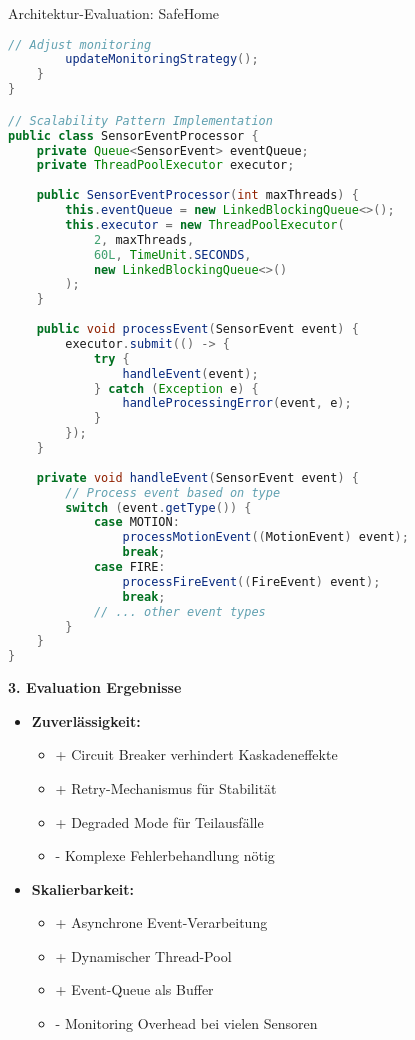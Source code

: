 \begin{example2}[breakable]{Architektur-Evaluation: SafeHome}
\begin{lstlisting}[language=Java, style=basesmol]
        // Adjust monitoring
        updateMonitoringStrategy();
    }
}

// Scalability Pattern Implementation
public class SensorEventProcessor {
    private Queue<SensorEvent> eventQueue;
    private ThreadPoolExecutor executor;
    
    public SensorEventProcessor(int maxThreads) {
        this.eventQueue = new LinkedBlockingQueue<>();
        this.executor = new ThreadPoolExecutor(
            2, maxThreads,
            60L, TimeUnit.SECONDS,
            new LinkedBlockingQueue<>()
        );
    }
    
    public void processEvent(SensorEvent event) {
        executor.submit(() -> {
            try {
                handleEvent(event);
            } catch (Exception e) {
                handleProcessingError(event, e);
            }
        });
    }
    
    private void handleEvent(SensorEvent event) {
        // Process event based on type
        switch (event.getType()) {
            case MOTION:
                processMotionEvent((MotionEvent) event);
                break;
            case FIRE:
                processFireEvent((FireEvent) event);
                break;
            // ... other event types
        }
    }
}

\end{lstlisting}

\textbf{3. Evaluation Ergebnisse}
\begin{itemize}
    \item \textbf{Zuverlässigkeit:}
    \begin{itemize}
        \item + Circuit Breaker verhindert Kaskadeneffekte
        \item + Retry-Mechanismus für Stabilität
        \item + Degraded Mode für Teilausfälle
        \item - Komplexe Fehlerbehandlung nötig
    \end{itemize}
    
    \item \textbf{Skalierbarkeit:}
    \begin{itemize}
        \item + Asynchrone Event-Verarbeitung
        \item + Dynamischer Thread-Pool
        \item + Event-Queue als Buffer
        \item - Monitoring Overhead bei vielen Sensoren
    \end{itemize}
\end{itemize}
\end{example2}

